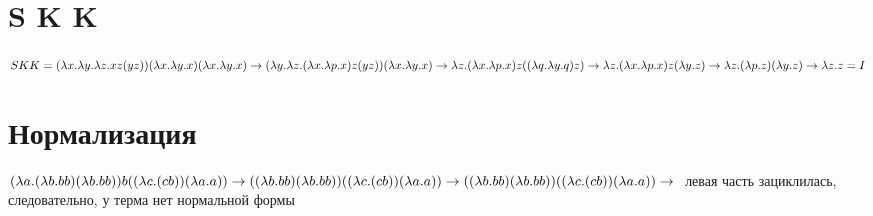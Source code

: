 \documentclass{article}
\begin{document}
\section{S K K}
    $
    SKK = (\lambda x.\lambda y.\lambda z.xz(yz))(\lambda x.\lambda y.x)(\lambda x.\lambda y.x) \to \\
    (\lambda y.\lambda z.(\lambda x.\lambda p.x)z(yz))(\lambda x.\lambda y.x) \to \\
    \lambda z.(\lambda x.\lambda p.x)z((\lambda q.\lambda y.q)z) \to \\
    \lambda z.(\lambda x.\lambda p.x)z(\lambda y.z) \to \\
    \lambda z.(\lambda p.z)(\lambda y.z) \to \\
    \lambda z.z = I
    $

\section{Нормализация}
    $
    (\lambda a.(\lambda b.bb)(\lambda b.bb))b((\lambda c.(cb))(\lambda a.a)) \to \\
    ((\lambda b.bb)(\lambda b.bb))((\lambda c.(cb))(\lambda a.a)) \to \\
    ((\lambda b.bb)(\lambda b.bb))((\lambda c.(cb))(\lambda a.a)) \to \\
    $
    левая часть зациклилась, следовательно, у терма нет нормальной формы
\end{document}
